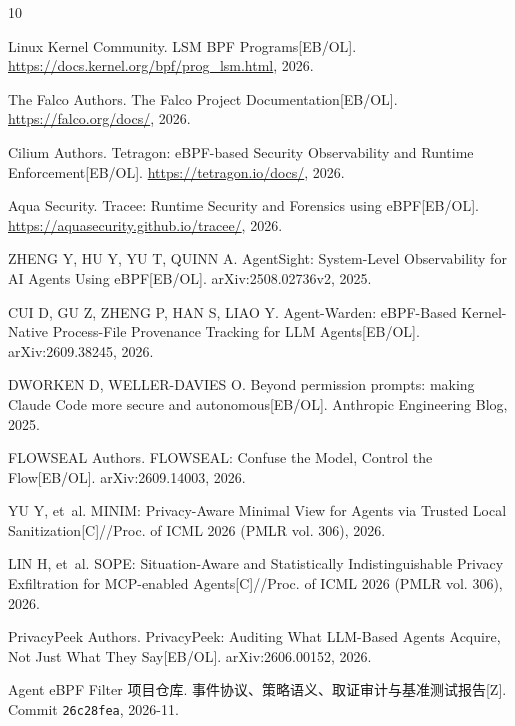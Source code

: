 \documentclass[UTF8,a4paper,zihao=-4,twocolumn]{ctexart}
\newcommand{\code}[1]{\texttt{\small #1}}
\begin{document}
\footnotesize
\begin{thebibliography}{10}

Linux Kernel Community.
\newblock LSM BPF Programs[EB/OL].
\newblock \url{https://docs.kernel.org/bpf/prog_lsm.html}, 2026.

The Falco Authors.
\newblock The Falco Project Documentation[EB/OL].
\newblock \url{https://falco.org/docs/}, 2026.

Cilium Authors.
\newblock Tetragon: eBPF-based Security Observability and Runtime Enforcement[EB/OL].
\newblock \url{https://tetragon.io/docs/}, 2026.

Aqua Security.
\newblock Tracee: Runtime Security and Forensics using eBPF[EB/OL].
\newblock \url{https://aquasecurity.github.io/tracee/}, 2026.

ZHENG Y, HU Y, YU T, QUINN A.
\newblock AgentSight: System-Level Observability for AI Agents Using eBPF[EB/OL].
\newblock arXiv:2508.02736v2, 2025.

CUI D, GU Z, ZHENG P, HAN S, LIAO Y.
\newblock Agent-Warden: eBPF-Based Kernel-Native Process-File Provenance Tracking for LLM Agents[EB/OL].
\newblock arXiv:2609.38245, 2026.

DWORKEN D, WELLER-DAVIES O.
\newblock Beyond permission prompts: making Claude Code more secure and autonomous[EB/OL].
\newblock Anthropic Engineering Blog, 2025.

FLOWSEAL Authors.
\newblock FLOWSEAL: Confuse the Model, Control the Flow[EB/OL].
\newblock arXiv:2609.14003, 2026.

YU Y, et~al.
\newblock MINIM: Privacy-Aware Minimal View for Agents via Trusted Local Sanitization[C]//Proc. of ICML 2026 (PMLR vol. 306), 2026.

LIN H, et~al.
\newblock SOPE: Situation-Aware and Statistically Indistinguishable Privacy Exfiltration for MCP-enabled Agents[C]//Proc. of ICML 2026 (PMLR vol. 306), 2026.

PrivacyPeek Authors.
\newblock PrivacyPeek: Auditing What LLM-Based Agents Acquire, Not Just What They Say[EB/OL].
\newblock arXiv:2606.00152, 2026.

Agent eBPF Filter 项目仓库.
\newblock 事件协议、策略语义、取证审计与基准测试报告[Z].
\newblock Commit \code{26c28fea}, 2026-11.


\end{thebibliography}
\end{document}
